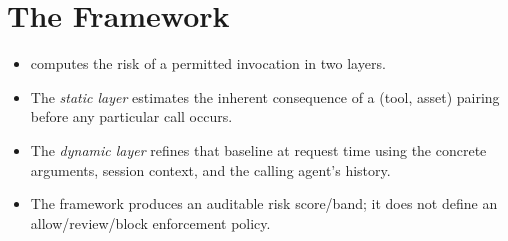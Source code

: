%
%
%
%
%
\section{The Framework}
\label{sec:framework}

\begin{itemize}
  \item \framework{} computes the risk of a permitted invocation in two layers.
  \item The \emph{static layer} estimates the inherent consequence of a
        (tool, asset) pairing before any particular call occurs.
  \item The \emph{dynamic layer} refines that baseline at request time using the
        concrete arguments, session context, and the calling agent's history.
  \item The framework produces an auditable risk score/band; it does not define
        an allow/review/block enforcement policy.
\end{itemize}

